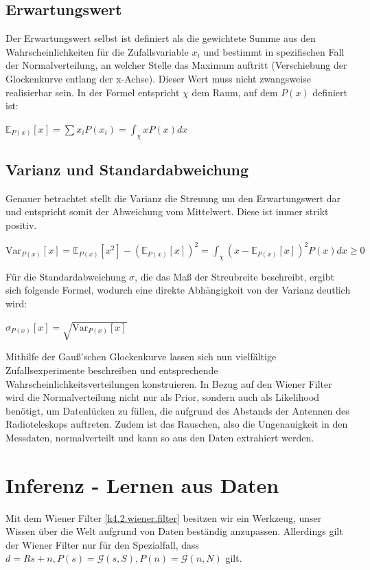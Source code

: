 \documentclass[]{dsadokumentation}
\begin{document}
\subsection{Erwartungswert}
Der Erwartungswert selbst ist definiert als die gewichtete Summe aus den Wahrscheinlichkeiten für die Zufallsvariable $x _i$ und bestimmt in spezifischen Fall der Normalverteilung, an welcher Stelle das Maximum auftritt (Verschiebung der Glockenkurve entlang der x-Achse). Dieser Wert muss nicht zwangsweise realisierbar sein. In der Formel entspricht $\chi$ dem Raum, auf dem $P(x)$ definiert ist:
\begin{center} $\mathbb{E} _{P(x)} [x] = \sum x _i P(x _i) = \int_{\chi} x P(x) dx$ \end{center}

\subsection{Varianz und Standardabweichung}
Genauer betrachtet stellt die Varianz die Streuung um den Erwartungswert dar und entspricht somit der Abweichung vom Mittelwert. Diese ist immer strikt positiv.
\begin{center} $\mathrm{Var} _{P(x)} [x] = \mathbb{E} _{P(x)} [x^{2}] - (\mathbb{E} _{P(x)} [x])^{2} = \int_ {\chi} (x - \mathbb{E} _{P(x)} [x])^{2} P(x) dx \geq 0$ \end{center}
Für die Standardabweichung $\sigma$, die das Maß der Streubreite beschreibt, ergibt sich folgende Formel, wodurch eine direkte Abhängigkeit von der Varianz deutlich wird:
\begin{center} $\sigma _{P(x)} [x] = \sqrt{\mathrm{Var} _{P(x)} [x]}$ \end{center}

Mithilfe der Gauß'schen Glockenkurve lassen sich nun vielfältige Zufallsexperimente beschreiben und entsprechende Wahrscheinlichkeitsverteilungen konstruieren. In Bezug auf den Wiener Filter wird die Normalverteilung nicht nur als Prior, sondern auch als Likelihood benötigt, um Datenlücken zu füllen, die aufgrund des Abstands der Antennen des Radioteleskops auftreten. Zudem ist das Rauschen, also die Ungenauigkeit in den Messdaten, normalverteilt und kann so aus den Daten extrahiert werden.



\section{Inferenz - Lernen aus Daten}
Mit dem Wiener Filter \cref{k4.2.wiener.filter} besitzen wir ein Werkzeug, unser Wissen über die Welt aufgrund von Daten beständig anzupassen. Allerdings gilt der Wiener Filter nur für den Spezialfall, dass $d=Rs+n, P(s)=\mathcal{G}(s,S), P(n) = \mathcal{G}(n,N)$ gilt.
\end{document}
